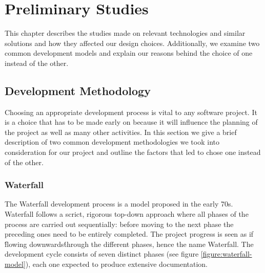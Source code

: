\chapter{Preliminary Studies}
\label{Preliminary Studies}

This chapter describes the studies made on relevant technologies and similar solutions and how they affected our design choices. 
Additionally, we examine two common development models and explain our reasons behind the choice of one instead of the other.


\section{Development Methodology}
\label{section:development-methodology}

Choosing an appropriate development process is vital to any software project.
It is a choice that has to be made early on because it will influence the planning of the project as well as many other activities. 
In this section we give a brief description of two common development methodologies we took into consideration for our project and outline the factors that led to chose one instead of the other.

\subsection{Waterfall}

The Waterfall development process is a model proposed in the early 70s.
Waterfall follows a scrict, rigorous top-down approach where all phases of the process are carried out sequentially: before moving to the next phase the preceding ones need to be entirely completed. The project progress is seen as if \'flowing downwards\' through the different phases, hence the name Waterfall. 
The development cycle consists of seven distinct phases (see figure \ref{figure:waterfall-model}), each one expected to produce extensive documentation.

